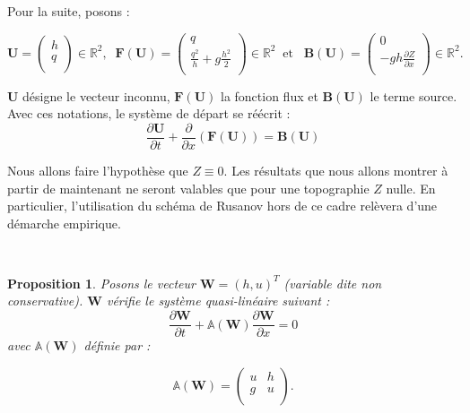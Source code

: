 \documentclass[
11pt, %
francais, %
singlespacing, %
headsepline, %
]{MastersDoctoralThesis} %
\newtheorem{prop}{Proposition}
\theoremstyle{definition}
\begin{document}
Pour la suite, posons :

\begin{center}

$\textbf{U}=\begin{pmatrix}
   h \\
    q \\
\end{pmatrix}\in\mathbb{R}^{2},  \phantom{..} \textbf{F} (\textbf{U}) =\begin{pmatrix}
   q \\
   \frac{q^{2}}{h}+g\frac{h^{2}}{2} \\
\end{pmatrix}\in\mathbb{R}^{2} \phantom{..} \text{et} \phantom{...} \textbf{B} (\textbf{U}) =\begin{pmatrix}
   0 \\
   -gh \frac{\partial Z}{\partial x}\\
\end{pmatrix}\in\mathbb{R}^{2}.
$
\end{center}

$\textbf{U}$ désigne le vecteur inconnu, $\textbf{F} (\textbf{U})$ la fonction flux et $\textbf{B} (\textbf{U})$ le terme source. Avec ces notations,
le système de départ se réécrit : $$\frac{\partial\textbf{U}}{\partial t}+\frac{\partial}{\partial x}(\textbf{F} (\textbf{U})) = \textbf{B} (\textbf{U})$$

Nous allons faire l'hypothèse que $Z \equiv 0$. Les résultats que nous allons montrer à partir de maintenant ne seront valables que pour une topographie $Z$ nulle.
En particulier, l'utilisation du schéma de Rusanov hors de ce cadre relèvera d'une démarche empirique.

\

\begin{prop}
Posons le vecteur $\textbf{W}= (h, u)^{T}$ (variable dite non conservative). $\textbf{W}$ vérifie le système quasi-linéaire suivant :
$$ \frac{\partial \textbf{W}}{\partial t} +\mathbb{A}(\textbf{W}) \frac{\partial\textbf{W}}{\partial x} = 0 \label{ql} $$
avec $\mathbb{A}(\textbf{W})$ définie par :

$$\mathbb{A}(\textbf{W}) =\begin{pmatrix}
   u & h  \\
   g & u  \\
\end{pmatrix}.$$

\end{prop}
\end{document}
